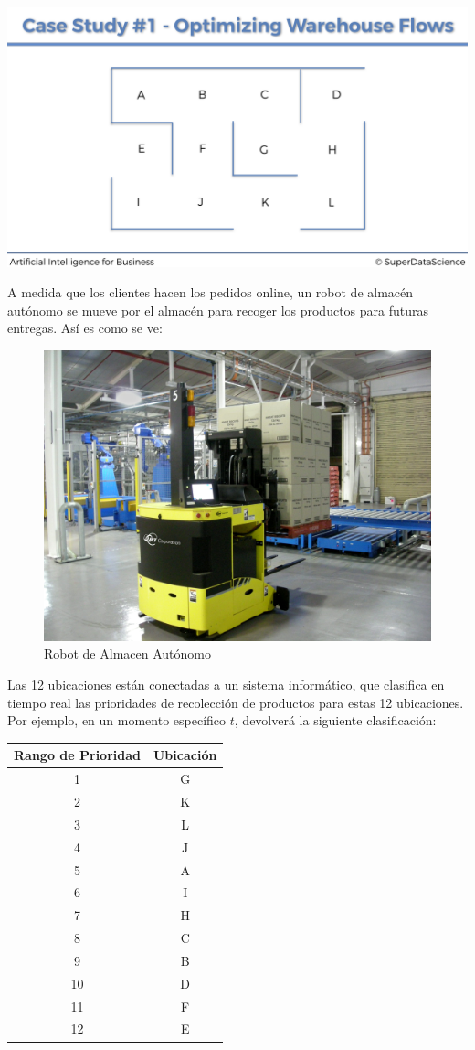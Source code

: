 \documentclass[]{book}
\begin{document}
\includegraphics[width=1\textwidth,height=\textheight]{Images/Warehouse_2.png}

A medida que los clientes hacen los pedidos online, un robot de almacén autónomo se mueve por el almacén para recoger los productos para futuras entregas. Así es como se ve:

\begin{figure}
\centering
\includegraphics[width=1\textwidth,height=\textheight]{Images/Autonomous_Warehouse_Robot.jpg}
\caption{Robot de Almacen Autónomo}
\end{figure}

Las 12 ubicaciones están conectadas a un sistema informático, que clasifica en tiempo real las prioridades de recolección de productos para estas 12 ubicaciones. Por ejemplo, en un momento específico \(t\), devolverá la siguiente clasificación:

\begin{longtable}[]{@{}cc@{}}
\toprule
\textbf{Rango de Prioridad} & \textbf{Ubicación}\tabularnewline
\midrule
\endhead
1 & G\tabularnewline
2 & K\tabularnewline
3 & L\tabularnewline
4 & J\tabularnewline
5 & A\tabularnewline
6 & I\tabularnewline
7 & H\tabularnewline
8 & C\tabularnewline
9 & B\tabularnewline
10 & D\tabularnewline
11 & F\tabularnewline
12 & E\tabularnewline
\bottomrule
\end{longtable}
\end{document}
